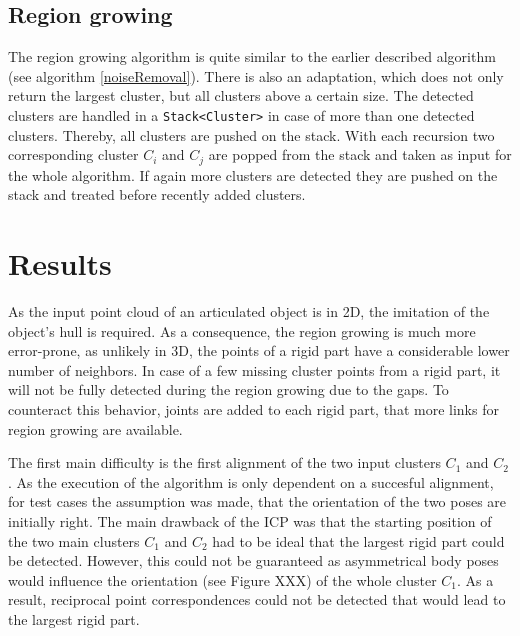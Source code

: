 \subsection{Region growing}
\label{RegionGrowing}
The region growing algorithm is quite similar to the earlier described algorithm (see algorithm \ref{noiseRemoval}). There is also an adaptation, which does not only return the largest cluster, but all clusters above a certain size. The detected clusters are handled in a \texttt{Stack<Cluster>} in case of more than one detected clusters. Thereby, all clusters are pushed on the stack. With each recursion two corresponding cluster $C_i$ and $C_j$ are popped from the stack and taken as input for the whole algorithm. If again more clusters are detected they are pushed on the stack and treated before recently added clusters.

\section{Results}
\label{ResultsLRP}

As the input point cloud of an articulated object is in 2D, the imitation of the object's hull is required. As a consequence, the region growing is much more error-prone, as unlikely in 3D, the points of a rigid part have a considerable lower number of neighbors. In case of a few missing cluster points from a rigid part, it will not be fully detected during the region growing due to the gaps. To counteract this behavior, joints are added to each rigid part, that more links for region growing are available. 


The first main difficulty is the first alignment of the two input clusters $C_1$ and $C_2$. As the execution of the algorithm is only dependent on a succesful alignment, for test cases the assumption was made, that the orientation of the two poses are initially right. The main drawback of the ICP was that the starting position of the two main clusters $C_1$ and $C_2$ had to be ideal that the largest rigid part could be detected. However, this could not be guaranteed as asymmetrical body poses would influence the orientation (see Figure XXX) of the whole cluster $C_1$. As a result, reciprocal point correspondences could not be detected that would lead to the largest rigid part.

